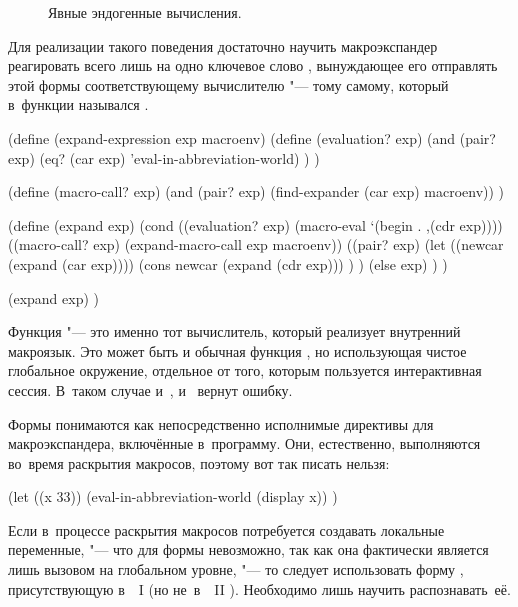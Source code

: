 \begin{figure}\centering

\caption{Явные эндогенные вычисления.}%
\label{macros/define/unique/pic:endogeny}
\end{figure}

Для реализации такого поведения достаточно научить макроэкспандер реагировать
всего лишь на одно ключевое слово , вынуждающее
его отправлять  этой формы соответствующему вычислителю "--- тому
самому, который в~функции  назывался
.

\begin{code:lisp}
(define (expand-expression exp macroenv)
  (define (evaluation? exp)
    (and (pair? exp)
         (eq? (car exp) 'eval-in-abbreviation-world) ) )

  (define (macro-call? exp)
    (and (pair? exp) (find-expander (car exp) macroenv)) )

  (define (expand exp)
    (cond ((evaluation? exp) (macro-eval `(begin . ,(cdr exp))))
          ((macro-call? exp) (expand-macro-call exp macroenv))
          ((pair? exp)
           (let ((newcar (expand (car exp))))
             (cons newcar (expand (cdr exp))) ) )
          (else exp) ) )

  (expand exp) )
\end{code:lisp}

Функция  "--- это именно тот вычислитель, который реализует
внутренний макроязык. Это может быть и обычная функция , но
использующая чистое глобальное окружение, отдельное от того, которым пользуется
интерактивная сессия. В~таком случае и~, и~
вернут ошибку.

Формы  понимаются как непосредственно исполнимые
директивы для макроэкспандера, включённые в~программу. Они, естественно,
выполняются во~время раскрытия макросов, поэтому вот так писать нельзя:

\begin{code:lisp}
(let ((x 33))
  (eval-in-abbreviation-world (display x)) )
\end{code:lisp}

Если в~процессе раскрытия макросов потребуется создавать локальные переменные,
"--- что для формы  невозможно, так как она
фактически является лишь вызовом  на глобальном уровне, "--- то следует
использовать форму , присутствующую в~\CommonLisp~I
\cite{ste84} (но не~в~\CommonLisp~II \cite{ste90}). Необходимо лишь научить
 распознавать~её.

